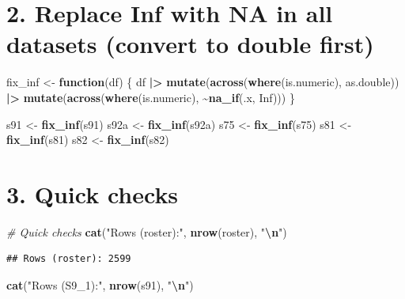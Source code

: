 \documentclass[
]{article}
\newenvironment{Shaded}{\begin{snugshade}}{\end{snugshade}}
\newcommand{\CommentTok}[1]{\textcolor[rgb]{0.56,0.35,0.01}{\textit{#1}}}
\newcommand{\ConstantTok}[1]{\textcolor[rgb]{0.56,0.35,0.01}{#1}}
\newcommand{\ControlFlowTok}[1]{\textcolor[rgb]{0.13,0.29,0.53}{\textbf{#1}}}
\newcommand{\FunctionTok}[1]{\textcolor[rgb]{0.13,0.29,0.53}{\textbf{#1}}}
\newcommand{\NormalTok}[1]{#1}
\newcommand{\OtherTok}[1]{\textcolor[rgb]{0.56,0.35,0.01}{#1}}
\newcommand{\SpecialCharTok}[1]{\textcolor[rgb]{0.81,0.36,0.00}{\textbf{#1}}}
\newcommand{\StringTok}[1]{\textcolor[rgb]{0.31,0.60,0.02}{#1}}
\begin{document}
\section{2. Replace Inf with NA in all datasets (convert to double
first)}\label{replace-inf-with-na-in-all-datasets-convert-to-double-first}

\begin{Shaded}
\begin{Highlighting}[]
\NormalTok{fix\_inf }\OtherTok{\textless{}{-}} \ControlFlowTok{function}\NormalTok{(df) \{}
\NormalTok{  df }\SpecialCharTok{|\textgreater{}}
    \FunctionTok{mutate}\NormalTok{(}\FunctionTok{across}\NormalTok{(}\FunctionTok{where}\NormalTok{(is.numeric), as.double)) }\SpecialCharTok{|\textgreater{}}
    \FunctionTok{mutate}\NormalTok{(}\FunctionTok{across}\NormalTok{(}\FunctionTok{where}\NormalTok{(is.numeric), }\SpecialCharTok{\textasciitilde{}}\FunctionTok{na\_if}\NormalTok{(.x, }\ConstantTok{Inf}\NormalTok{)))}
\NormalTok{\}}

\NormalTok{s91 }\OtherTok{\textless{}{-}} \FunctionTok{fix\_inf}\NormalTok{(s91)}
\NormalTok{s92a }\OtherTok{\textless{}{-}} \FunctionTok{fix\_inf}\NormalTok{(s92a)}
\NormalTok{s75 }\OtherTok{\textless{}{-}} \FunctionTok{fix\_inf}\NormalTok{(s75)}
\NormalTok{s81 }\OtherTok{\textless{}{-}} \FunctionTok{fix\_inf}\NormalTok{(s81)}
\NormalTok{s82 }\OtherTok{\textless{}{-}} \FunctionTok{fix\_inf}\NormalTok{(s82)}
\end{Highlighting}
\end{Shaded}

\section{3. Quick checks}\label{quick-checks}

\begin{Shaded}
\begin{Highlighting}[]
\CommentTok{\# Quick checks}
\FunctionTok{cat}\NormalTok{(}\StringTok{"Rows (roster):"}\NormalTok{, }\FunctionTok{nrow}\NormalTok{(roster), }\StringTok{"}\SpecialCharTok{\textbackslash{}n}\StringTok{"}\NormalTok{)}
\end{Highlighting}
\end{Shaded}

\begin{verbatim}
## Rows (roster): 2599
\end{verbatim}

\begin{Shaded}
\begin{Highlighting}[]
\FunctionTok{cat}\NormalTok{(}\StringTok{"Rows (S9\_1):"}\NormalTok{, }\FunctionTok{nrow}\NormalTok{(s91), }\StringTok{"}\SpecialCharTok{\textbackslash{}n}\StringTok{"}\NormalTok{)}
\end{Highlighting}
\end{Shaded}
\end{document}
